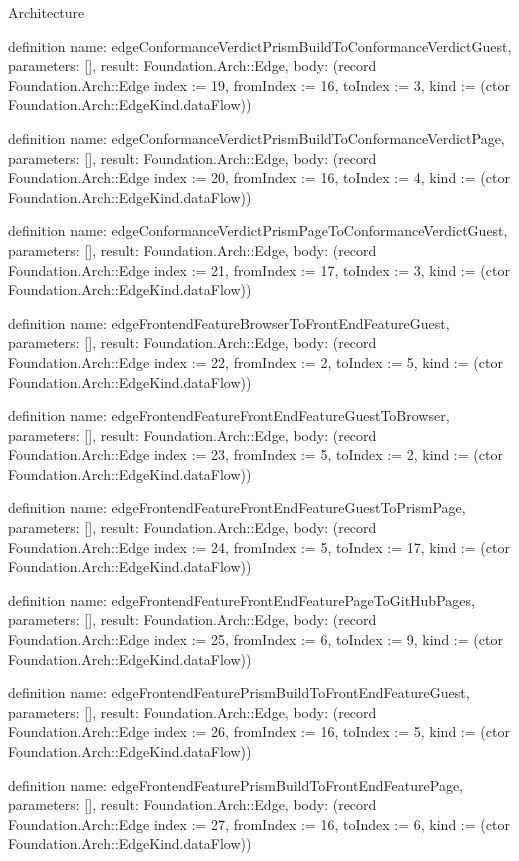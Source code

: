 \begin{lexlean}{Architecture}
\begin{semanticmodule}
definition{
  name: edgeConformanceVerdictPrismBuildToConformanceVerdictGuest,
  parameters: [],
  result: Foundation.Arch::Edge,
  body: (record Foundation.Arch::Edge {index := 19, fromIndex := 16, toIndex := 3, kind := (ctor Foundation.Arch::EdgeKind.dataFlow)})
}

definition{
  name: edgeConformanceVerdictPrismBuildToConformanceVerdictPage,
  parameters: [],
  result: Foundation.Arch::Edge,
  body: (record Foundation.Arch::Edge {index := 20, fromIndex := 16, toIndex := 4, kind := (ctor Foundation.Arch::EdgeKind.dataFlow)})
}

definition{
  name: edgeConformanceVerdictPrismPageToConformanceVerdictGuest,
  parameters: [],
  result: Foundation.Arch::Edge,
  body: (record Foundation.Arch::Edge {index := 21, fromIndex := 17, toIndex := 3, kind := (ctor Foundation.Arch::EdgeKind.dataFlow)})
}

definition{
  name: edgeFrontendFeatureBrowserToFrontEndFeatureGuest,
  parameters: [],
  result: Foundation.Arch::Edge,
  body: (record Foundation.Arch::Edge {index := 22, fromIndex := 2, toIndex := 5, kind := (ctor Foundation.Arch::EdgeKind.dataFlow)})
}

definition{
  name: edgeFrontendFeatureFrontEndFeatureGuestToBrowser,
  parameters: [],
  result: Foundation.Arch::Edge,
  body: (record Foundation.Arch::Edge {index := 23, fromIndex := 5, toIndex := 2, kind := (ctor Foundation.Arch::EdgeKind.dataFlow)})
}

definition{
  name: edgeFrontendFeatureFrontEndFeatureGuestToPrismPage,
  parameters: [],
  result: Foundation.Arch::Edge,
  body: (record Foundation.Arch::Edge {index := 24, fromIndex := 5, toIndex := 17, kind := (ctor Foundation.Arch::EdgeKind.dataFlow)})
}

definition{
  name: edgeFrontendFeatureFrontEndFeaturePageToGitHubPages,
  parameters: [],
  result: Foundation.Arch::Edge,
  body: (record Foundation.Arch::Edge {index := 25, fromIndex := 6, toIndex := 9, kind := (ctor Foundation.Arch::EdgeKind.dataFlow)})
}

definition{
  name: edgeFrontendFeaturePrismBuildToFrontEndFeatureGuest,
  parameters: [],
  result: Foundation.Arch::Edge,
  body: (record Foundation.Arch::Edge {index := 26, fromIndex := 16, toIndex := 5, kind := (ctor Foundation.Arch::EdgeKind.dataFlow)})
}

definition{
  name: edgeFrontendFeaturePrismBuildToFrontEndFeaturePage,
  parameters: [],
  result: Foundation.Arch::Edge,
  body: (record Foundation.Arch::Edge {index := 27, fromIndex := 16, toIndex := 6, kind := (ctor Foundation.Arch::EdgeKind.dataFlow)})
}


\end{semanticmodule}
\end{lexlean}
